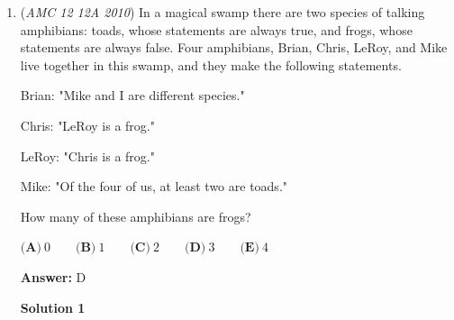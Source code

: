 \begin{enumerate}
 $\textbf{(A)}\ \frac{7}{15} \qquad \textbf{(B)}\ \frac{7}{8} \qquad \textbf{(C)}\ \frac{8}{7} \qquad \textbf{(D)}\ \frac{15}{8} \qquad \textbf{(E)}\ \frac{15}{7}$

 \textbf{Answer: }C



\textbf{Solution 1}

This problem is quickly solved with knowledge of the laws of exponents and logarithms.

 
 \begin{align*} 7^{x+7} &= 8^x \\  7^x*7^7 &= 8^x \\  \left(\frac{8}{7}\right)^x &= 7^7 \\  x &= \log_{8/7}7^7 \end{align*}


 Since we are looking for the base of the logarithm, our answer is $\boxed{\textbf{(C)}\ \frac{8}{7}}$.

 



\textbf{Solution 2}

First, take the $\log_{7}$ of both sides, which gives us $x+7=\log_{7}8^x=x\log_{7}8$. We move the $x$ terms to 1 side. $x(\log_{7}8-1)=7$. Isolate $x$ and manipulate the answer. $x=\frac{7}{\log_{7}\frac{8}{7}}=7\log_{\frac{8}{7}}7=\log_{\frac{8}{7}}7^7$. Therefore, the answer is $\frac{8}{7}=\fbox{C}$



	\item (\textit{AMC 12 12A 2010}) In a magical swamp there are two species of talking amphibians: toads, whose statements are always true, and frogs, whose statements are always false. Four amphibians, Brian, Chris, LeRoy, and Mike live together in this swamp, and they make the following statements.


 Brian: "Mike and I are different species."


 Chris: "LeRoy is a frog."


 LeRoy: "Chris is a frog."


 Mike: "Of the four of us, at least two are toads."


 How many of these amphibians are frogs?


 $\textbf{(A)}\ 0 \qquad \textbf{(B)}\ 1 \qquad \textbf{(C)}\ 2 \qquad \textbf{(D)}\ 3 \qquad \textbf{(E)}\ 4$

 \textbf{Answer: }D



\textbf{Solution 1}


\end{enumerate}
